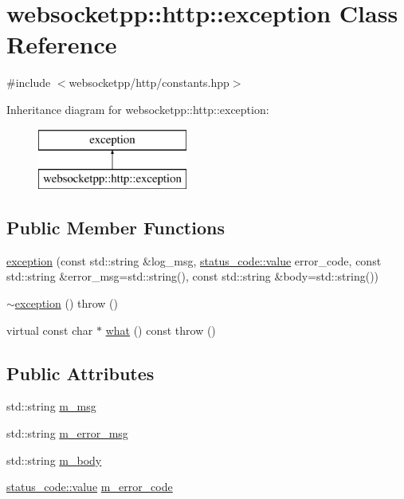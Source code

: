 \hypertarget{classwebsocketpp_1_1http_1_1exception}{}\section{websocketpp\+:\+:http\+:\+:exception Class Reference}
\label{classwebsocketpp_1_1http_1_1exception}


{\ttfamily \#include $<$websocketpp/http/constants.\+hpp$>$}

Inheritance diagram for websocketpp\+:\+:http\+:\+:exception\+:\begin{figure}[H]
\begin{center}
\leavevmode
\includegraphics[height=2.000000cm]{classwebsocketpp_1_1http_1_1exception}
\end{center}
\end{figure}
\subsection*{Public Member Functions}
\begin{DoxyCompactItemize}
\item 
\hyperlink{classwebsocketpp_1_1http_1_1exception_a693f5feba657716d2bd20673951b5d28}{exception} (const std\+::string \&log\+\_\+msg, \hyperlink{namespacewebsocketpp_1_1http_1_1status__code_ae0d61c309e053ee5673517b54e2886c6}{status\+\_\+code\+::value} error\+\_\+code, const std\+::string \&error\+\_\+msg=std\+::string(), const std\+::string \&body=std\+::string())
\item 
\hyperlink{classwebsocketpp_1_1http_1_1exception_a477ee3e56c8b0a54d599d735b834663a}{$\sim$exception} ()  throw ()
\item 
virtual const char $\ast$ \hyperlink{classwebsocketpp_1_1http_1_1exception_a1c8f3c1df959a9f60f843ff48301f95c}{what} () const   throw ()
\end{DoxyCompactItemize}
\subsection*{Public Attributes}
\begin{DoxyCompactItemize}
\item 
std\+::string \hyperlink{classwebsocketpp_1_1http_1_1exception_a2be9d8a05bad1b10432fdf4e25159dfe}{m\+\_\+msg}
\item 
std\+::string \hyperlink{classwebsocketpp_1_1http_1_1exception_ab723cf4d6e80075e9a73da3b7577cdc3}{m\+\_\+error\+\_\+msg}
\item 
std\+::string \hyperlink{classwebsocketpp_1_1http_1_1exception_ac8a456ed1db5ead45831fdc61b216958}{m\+\_\+body}
\item 
\hyperlink{namespacewebsocketpp_1_1http_1_1status__code_ae0d61c309e053ee5673517b54e2886c6}{status\+\_\+code\+::value} \hyperlink{classwebsocketpp_1_1http_1_1exception_a169eaa70f405f073091194113fe75d0c}{m\+\_\+error\+\_\+code}
\end{DoxyCompactItemize}


